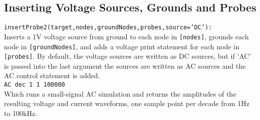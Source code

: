 \subsection{Inserting Voltage Sources, Grounds and Probes}
\texttt{insertProbe2(target,nodes,groundNodes,probes,source='DC'):}\\
Inserts a 1V voltage source from ground to each node in \texttt{[nodes]}, grounds each node in \texttt{[groundNodes]}, and adds a voltage print statement for each node in \texttt{[probes]}.
By default, the voltage sources are written as DC sources, but if 'AC' is passed into the last argument the sources are written as AC sources and the AC control statement is added.\\
\texttt{AC dec 1 1 100000}\\
Which runs a small-signal AC simulation and returns the amplitudes of the resulting voltage and current waveforms, one sample point per decade from 1Hz to 100kHz.


